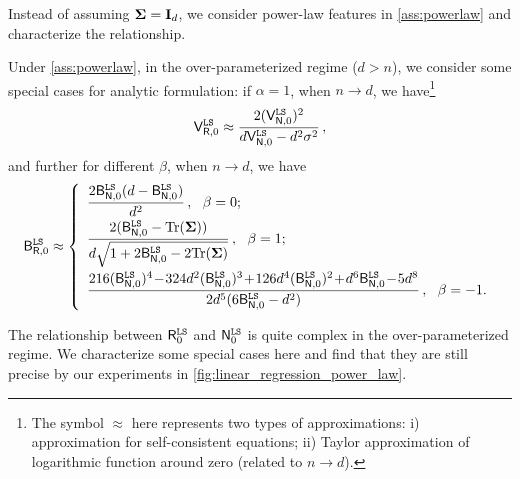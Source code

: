 Instead of assuming ${\boldsymbol \Sigma} = {\mathbf I}_d$, we consider power-law features in \cref{ass:powerlaw} and characterize the relationship.
\begin{proposition}\label{prop:relation_minnorm_pl}
    Under \cref{ass:powerlaw}, in the over-parameterized regime ($d>n$), we consider some special cases for analytic formulation: if $\alpha=1$, when $n \to d$, we have\footnote{The symbol $\approx$ here represents two types of approximations: i) approximation for self-consistent equations; ii) Taylor approximation of logarithmic function around zero (related to $n \to d$).}
    \[
    \begin{aligned}
        \mathsf V_{\mathsf R, 0}^{\tt LS} \approx \frac{2(\mathsf V_{\mathsf N, 0}^{\tt LS})^2}{d\mathsf V_{\mathsf N, 0}^{\tt LS}-d^2\sigma^2}\,, 
    \end{aligned}
    \]
    and further for different $\beta$, when $n \to d$, we have
    \begin{equation*}
		\sB_{\sR,0}^{\tt LS} \approx \left\{
		\begin{array}{rcl}
			\begin{aligned}
                    &  \frac{2\sB_{\sN, 0}^{\tt LS}(d-\sB_{\sN,0}^{\tt LS})}{d^2}\,,  ~~\text{$\beta=0$} ; \\
                    & \frac{2(\sB_{\sN, 0}^{\tt LS} - \Tr(\bSigma))}{d\sqrt{1+2\sB_{\sN, 0}^{\tt LS}-2\Tr(\bSigma)}} \,, ~~\text{$\beta=1$} ; \\
                    & \frac{216 (\sB_{\sN, 0}^{\tt LS})^4 \!-\! 324d^2 (\sB_{\sN, 0}^{\tt LS})^3 \!+\! 126d^4 (\sB_{\sN, 0}^{\tt LS})^2 \!+\! d^6 \sB_{\sN, 0}^{\tt LS} \!-\! 5d^8}{2d^5(6 \sB_{\sN, 0}^{\tt LS}-d^2)} \,, ~~\text{$\beta=-1$}.
			\end{aligned}
		\end{array} \right.
    \end{equation*}
\end{proposition}
The relationship between $\mathsf R^{\tt LS}_0$ and $\mathsf N^{\tt LS}_0$ is quite complex in the over-parameterized regime. We characterize some special cases here and find that they are still precise by our experiments in \cref{fig:linear_regression_power_law}.

